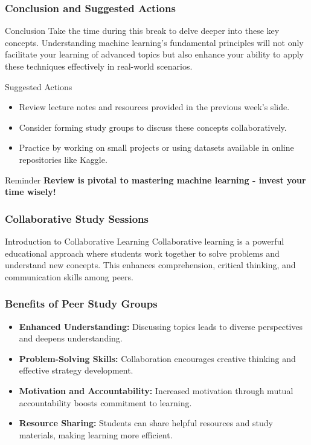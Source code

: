 \documentclass[aspectratio=169]{beamer}
\begin{document}
\begin{frame}[fragile]
    \frametitle{Conclusion and Suggested Actions}
    \begin{block}{Conclusion}
        Take the time during this break to delve deeper into these key concepts. Understanding machine learning's fundamental principles will not only facilitate your learning of advanced topics but also enhance your ability to apply these techniques effectively in real-world scenarios.
    \end{block}
    
    \begin{block}{Suggested Actions}
        \begin{itemize}
            \item Review lecture notes and resources provided in the previous week’s slide.
            \item Consider forming study groups to discuss these concepts collaboratively.
            \item Practice by working on small projects or using datasets available in online repositories like Kaggle.
        \end{itemize}
    \end{block}

    \begin{block}{Reminder}
        \textbf{Review is pivotal to mastering machine learning - invest your time wisely!}
    \end{block}
\end{frame}

\begin{frame}[fragile]
    \frametitle{Collaborative Study Sessions}
    \begin{block}{Introduction to Collaborative Learning}
        Collaborative learning is a powerful educational approach where students work together to solve problems and understand new concepts. This enhances comprehension, critical thinking, and communication skills among peers.
    \end{block}
\end{frame}

\begin{frame}[fragile]
    \frametitle{Benefits of Peer Study Groups}
    \begin{itemize}
        \item \textbf{Enhanced Understanding:} Discussing topics leads to diverse perspectives and deepens understanding.
        \item \textbf{Problem-Solving Skills:} Collaboration encourages creative thinking and effective strategy development.
        \item \textbf{Motivation and Accountability:} Increased motivation through mutual accountability boosts commitment to learning.
        \item \textbf{Resource Sharing:} Students can share helpful resources and study materials, making learning more efficient.
    \end{itemize}
\end{frame}
\end{document}
